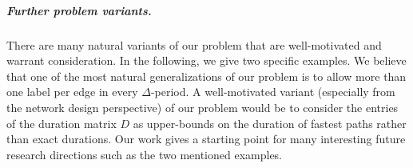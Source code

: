 \documentclass[a4paper,UKenglish,cleveref, autoref, thm-restate, anonymous]{lipics-v2021}
\begin{document}
\subparagraph{Further problem variants.}
There are many natural variants of our problem that are well-motivated and warrant consideration. In the following, we give two specific examples. We believe that one of the most natural generalizations of our problem is to allow more than one label per edge in every $\Delta$-period. A well-motivated variant (especially from the network design perspective) of our problem would be to consider the entries of the duration matrix $D$ as upper-bounds on the duration of fastest paths rather than exact durations. 
Our work gives a starting point for many interesting future research directions such as the two mentioned examples.

	


\clearpage

\appendix
\end{document}
